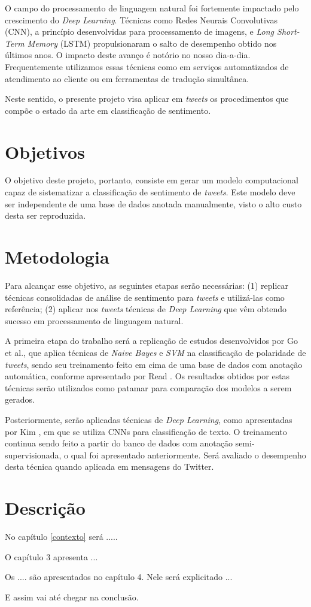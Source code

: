 O campo do processamento de linguagem natural foi fortemente impactado pelo crescimento do \textit{Deep Learning}. Técnicas como Redes Neurais Convolutivas (CNN), a princípio desenvolvidas para processamento de imagens, e \textit{Long Short-Term Memory} (LSTM) propulsionaram o salto de desempenho obtido nos últimos anos. O impacto deste avanço é notório no nosso dia-a-dia. Frequentemente utilizamos essas técnicas como em serviços automatizados de atendimento ao cliente ou em ferramentas de tradução simultânea.

Neste sentido, o presente projeto visa aplicar em \textit{tweets} os procedimentos que compõe o estado da arte em classificação de sentimento.

\section{Objetivos}

O objetivo deste projeto, portanto, consiste em gerar um modelo computacional capaz de sistematizar a classificação de sentimento de \textit{tweets}. Este modelo deve ser independente de uma base de dados anotada manualmente, visto o alto custo desta ser reproduzida.

\section{Metodologia}

Para alcançar esse objetivo, as seguintes etapas serão necessárias: (1) replicar técnicas consolidadas de análise de sentimento para \textit{tweets} e utilizá-las como referência; (2) aplicar nos \textit{tweets} técnicas de \textit{Deep Learning} que vêm obtendo sucesso em processamento de linguagem natural.

A primeira etapa do trabalho será a replicação de estudos desenvolvidos por Go et al., \cite{go09} que aplica técnicas de \textit{Naive Bayes} e \textit{SVM} na classificação de polaridade de \textit{tweets}, sendo seu treinamento feito em cima de uma base de dados com anotação automática, conforme apresentado por Read \cite{read05}. Os resultados obtidos por estas técnicas serão utilizados como patamar para comparação dos modelos a serem gerados.

Posteriormente, serão aplicadas técnicas de \textit{Deep Learning}, como apresentadas por Kim \cite{kim14}, em que se utiliza CNNs para classificação de texto. O treinamento continua sendo feito a partir do banco de dados com anotação semi-supervisionada, o qual foi apresentado anteriormente. Será avaliado o desempenho desta técnica quando aplicada em mensagens do Twitter.

\section{Descrição}

No capítulo \ref{contexto} será .....

O capítulo 3 apresenta ...

Os .... são apresentados no capítulo 4. Nele será explicitado ...

E assim vai até chegar na conclusão.
